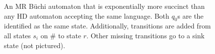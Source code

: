 \begin{figure}[ht]
\caption{An MR B\"uchi automaton that is exponentially more succinct than any HD automaton accepting the same language. Both $q_0$s are the identified as the same state. Additionally, transitions are added from all states $s_i$ on $\#$ to state $r$. Other missing transitions go to a sink state (not pictured).}\label{fig:succinctSRBuchi}
\end{figure} 